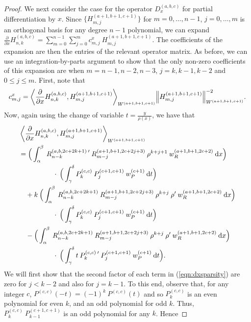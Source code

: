 \documentclass[11pt, oneside]{article}   	%
\newcommand{\pddx}{\frac{\partial}{\partial x}}
\newcommand{\hdop}{H}
\newcommand{\jac}{{P}}
\newcommand{\genjac}{R}
\newcommand{\genjacnmk}{\genjac_{n-k}}
\newcommand{\genjacmmj}{\genjac_{m-j}}
\newcommand{\genjacw}{w_\genjac}
\newcommand{\jacw}{w_P}
\newcommand{\hdopnkabc}{\hdop_{n,k}^{(a,b,c)}}
\begin{document}
\begin{proof}
We next consider the case for the operator $D_x^{(a,b,c)}$ for partial differentiation by $x$. Since $\{\hdop^{(a+1, b+1, c+1)}_{m,j}\}$ for $m = 0,\dots,n-1$, $j = 0,\dots,m$ is an orthogonal basis for any degree $n-1$ polynomial, we can expand $\pddx \hdopnkabc = \sum_{m=0}^{n-1} \sum_{j=0}^m c_{m,j}^x \: \hdop^{(a+1, b+1, c+1)}_{m,j}$. The coefficients of the expansion are then the entries of the relevant operator matrix. As before, we can use an integration-by-parts argument to show that the only non-zero coefficients of this expansion are when $m = n-1, n-2, n-3$, $j = k, k-1, k-2$ and $0 \le j \le m$. First, note that
\begin{align*}
	c_{m,j}^x = {\ip<\pddx \hdopnkabc, \hdop^{(a+1, b+1, c+1)}_{m,j} >_{W^{(a+1, b+1, c+1)}}}{\norm{\hdop^{(a+1, b+1, c+1)}_{m,j}}^{-2}_{W^{(a+1, b+1, c+1)}}}.
\end{align*}
Now, again using the change of variable $t= \frac{y}{\rho(x)}$, we have that
\begin{align}
	&\ip<\pddx \hdopnkabc, \hdop^{(a+1, b+1, c+1)}_{m,j} >_{W^{(a+1, b+1, c+1)}} \nonumber \\ 
	&= \Big( \int_\alpha^\beta \: \genjacnmk^{(a, b, 2c+2k+1) \: \prime} \: \genjacmmj^{(a+1, b+1, 2c+2j+3)} \: \rho^{k+j+1} \: \genjacw^{(a+1, b+1, 2c+2)} \: \D x \Big) \nonumber \\
	&\quad \quad \quad \quad \quad \cdot \: \Big( \int_\gamma^\delta \jac_k^{(c,c)} \: \jac_j^{(c+1,c+1)} \: \jacw^{(c+1)} \: \D t \Big) \nonumber \\ 
	& \quad + k \: \Big( \int_\alpha^\beta \: \genjacnmk^{(a, b, 2c+2k+1)} \: \genjacmmj^{(a+1, b+1, 2c+2j+3)} \: \rho^{k+j} \: \rho' \: \genjacw^{(a+1, b+1, 2c+2)} \: \D x \Big) \nonumber \\
	& \quad \quad \quad \quad \quad \cdot \: \Big( \int_\gamma^\delta \jac_k^{(c,c)} \: \jac_j^{(c+1,c+1)} \: \jacw^{(c+1)} \: \D t \Big) \nonumber \\
	& \quad - \Big( \int_\alpha^\beta \: \genjacnmk^{(a, b, 2c+2k+1)} \: \genjacmmj^{(a+1, b+1, 2c+2j+3)} \: \rho^{k+j} \: \rho' \: \genjacw^{(a+1, b+1, 2c+2)} \: \D x \Big) \nonumber \\
	& \quad \quad \quad \quad \quad \cdot \: \Big( \int_\gamma^\delta t \: \jac_k^{(c,c) \: \prime} \: \jac_j^{(c+1,c+1)} \: \jacw^{(c+1)} \: \D t \Big). \label{eqn:dxsparsity}
\end{align}
We will first show that the second factor of each term in (\ref{eqn:dxsparsity}) are zero for $j < k - 2$ and also for $j = k - 1$. To this end, observe that, for any integer $c$, $\jac^{(c,c)}(-t) = (-1)^k \: \jac^{(c,c)}(t)$ and so $\jac_k^{(c,c)}$ is an even polynomial for even $k$, and an odd polynomial for odd $k$. Thus, $\jac_k^{(c,c)} \: \jac_{k-1}^{(c+1,c+1)}$ is an odd polynomial for any $k$. Hence

\end{proof}
\end{document}
